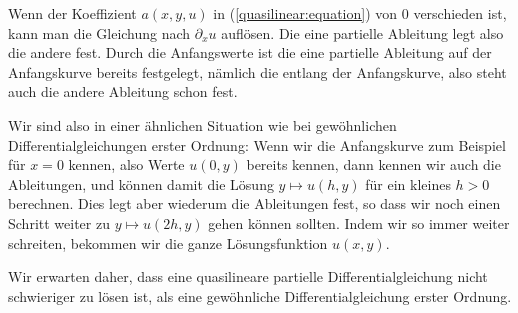 Wenn der Koeffizient $a(x,y,u)$
in (\ref{quasilinear:equation})
von $0$ verschieden ist, kann man die Gleichung
nach $\partial_xu$ auflösen.
Die eine partielle Ableitung legt also die andere fest.
Durch die Anfangswerte ist die eine partielle Ableitung auf der
Anfangskurve bereits festgelegt, nämlich die entlang der Anfangskurve,
also steht auch die andere Ableitung schon fest.

Wir sind also in einer ähnlichen Situation wie bei gewöhnlichen
Differentialgleichungen erster Ordnung: Wenn wir die 
Anfangskurve zum Beispiel für $x=0$ kennen, also Werte
$u(0,y)$ bereits kennen, dann kennen wir
auch die Ableitungen, und können damit die Lösung
$y\mapsto u(h, y)$ für ein kleines $h>0$ berechnen. Dies legt aber
wiederum die Ableitungen fest, so dass wir noch einen Schritt 
weiter zu $y\mapsto u(2h,y)$ gehen können sollten.
Indem wir so immer weiter schreiten, bekommen wir die ganze
Lösungsfunktion $u(x,y)$.

Wir erwarten daher, dass eine quasilineare partielle Differentialgleichung
nicht schwieriger zu lösen ist, als eine gewöhnliche Differentialgleichung
erster Ordnung.

